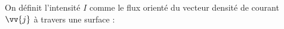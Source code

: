 \documentclass[a4paper]{article}
\begin{document}
\pagestyle{fancy}
\fancyhf{}
\setlength{\headheight}{15pt}

\begin{center}
	\large{}
\end{center}


On définit l'intensité \(I\) comme le flux orienté du vecteur densité de courant \(\vv{j}\) à travers une surface :\begin{center}\end{center}
\end{document}
